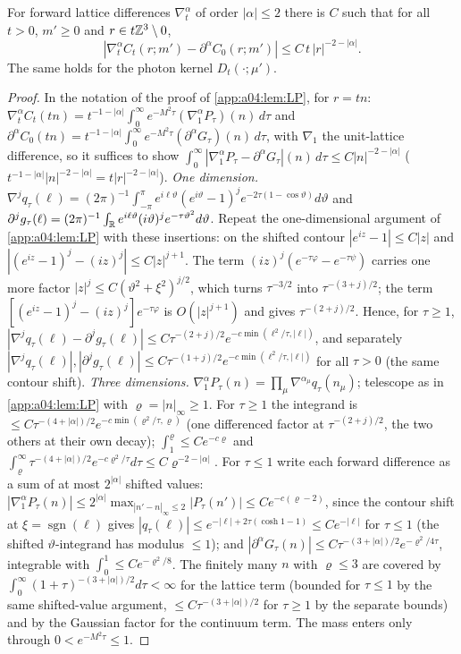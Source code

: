 \begin{lemma}\label{app:a04:lem:LPgrad}
For forward lattice differences $\nabla^\alpha_t$ of order $|\alpha|\le2$ there is $C$ such that for all $t>0$, $m'\ge0$ and $r\in t\mathbb Z^3\setminus0$,
\[
|\nabla^\alpha_tC_t(r;m')-\partial^\alpha C_0(r;m')|\le C\,t\,|r|^{-2-|\alpha|}.
\]
The same holds for the photon kernel $D_t(\cdot;\mu')$.
\end{lemma}
\begin{proof}
In the notation of the proof of \cref{app:a04:lem:LP}, for $r=tn$: $\nabla^\alpha_tC_t(tn)=t^{-1-|\alpha|}\int_0^\infty e^{-M^2\tau}(\nabla^\alpha_1P_\tau)(n)\,d\tau$ and $\partial^\alpha C_0(tn)=t^{-1-|\alpha|}\int_0^\infty e^{-M^2\tau}(\partial^\alpha G_\tau)(n)\,d\tau$, with $\nabla_1$ the unit-lattice difference, so it suffices to show $\int_0^\infty|\nabla^\alpha_1P_\tau-\partial^\alpha G_\tau|(n)\,d\tau\le C|n|^{-2-|\alpha|}$ ($t^{-1-|\alpha|}|n|^{-2-|\alpha|}=t|r|^{-2-|\alpha|}$). \emph{One dimension.} $\nabla^jq_\tau(\ell)=(2\pi)^{-1}\int_{-\pi}^\pi e^{i\ell\vartheta}(e^{i\vartheta}-1)^je^{-2\tau(1-\cos\vartheta)}d\vartheta$ and $\partial^jg_\tau(\ell)=(2\pi)^{-1}\int_{\mathbb R} e^{i\ell\vartheta}(i\vartheta)^je^{-\tau\vartheta^2}d\vartheta$. Repeat the one-dimensional argument of \cref{app:a04:lem:LP} with these insertions: on the shifted contour $|e^{iz}-1|\le C|z|$ and $|(e^{iz}-1)^j-(iz)^j|\le C|z|^{j+1}$. The term $(iz)^j(e^{-\tau\varphi}-e^{-\tau\psi})$ carries one more factor $|z|^j\le C(\vartheta^2+\xi^2)^{j/2}$, which turns $\tau^{-3/2}$ into $\tau^{-(3+j)/2}$; the term $[(e^{iz}-1)^j-(iz)^j]e^{-\tau\varphi}$ is $O(|z|^{j+1})$ and gives $\tau^{-(2+j)/2}$. Hence, for $\tau\ge1$, $|\nabla^jq_\tau(\ell)-\partial^jg_\tau(\ell)|\le C\tau^{-(2+j)/2}e^{-c\min(\ell^2/\tau,|\ell|)}$, and separately $|\nabla^jq_\tau(\ell)|,|\partial^jg_\tau(\ell)|\le C\tau^{-(1+j)/2}e^{-c\min(\ell^2/\tau,|\ell|)}$ for all $\tau>0$ (the same contour shift). \emph{Three dimensions.} $\nabla^\alpha_1P_\tau(n)=\prod_\mu\nabla^{\alpha_\mu}q_\tau(n_\mu)$; telescope as in \cref{app:a04:lem:LP} with $\varrho=|n|_\infty\ge1$. For $\tau\ge1$ the integrand is $\le C\tau^{-(4+|\alpha|)/2}e^{-c\min(\varrho^2/\tau,\varrho)}$ (one differenced factor at $\tau^{-(2+j)/2}$, the two others at their own decay); $\int_1^\varrho\le Ce^{-c\varrho}$ and $\int_\varrho^\infty\tau^{-(4+|\alpha|)/2}e^{-c\varrho^2/\tau}d\tau\le C\varrho^{-2-|\alpha|}$. For $\tau\le1$ write each forward difference as a sum of at most $2^{|\alpha|}$ shifted values: $|\nabla^\alpha_1P_\tau(n)|\le2^{|\alpha|}\max_{|n'-n|_\infty\le2}|P_\tau(n')|\le Ce^{-c(\varrho-2)}$, since the contour shift at $\xi=\operatorname{sgn}(\ell)$ gives $|q_\tau(\ell)|\le e^{-|\ell|+2\tau(\cosh1-1)}\le Ce^{-|\ell|}$ for $\tau\le1$ (the shifted $\vartheta$-integrand has modulus $\le1$); and $|\partial^\alpha G_\tau(n)|\le C\tau^{-(3+|\alpha|)/2}e^{-\varrho^2/4\tau}$, integrable with $\int_0^1\le Ce^{-\varrho^2/8}$. The finitely many $n$ with $\varrho\le3$ are covered by $\int_0^\infty(1+\tau)^{-(3+|\alpha|)/2}d\tau<\infty$ for the lattice term (bounded for $\tau\le1$ by the same shifted-value argument, $\le C\tau^{-(3+|\alpha|)/2}$ for $\tau\ge1$ by the separate bounds) and by the Gaussian factor for the continuum term. The mass enters only through $0<e^{-M^2\tau}\le1$.

\end{proof}
